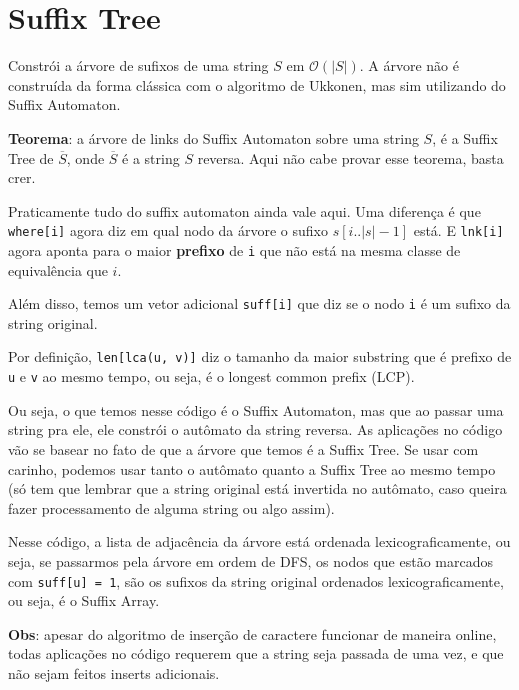 \documentclass[10pt, a4paper, oneside]{book}
\begin{document}
\section{Suffix Tree}


Constrói a árvore de sufixos de uma string $S$ em $\mathcal{O}(|S|)$. A árvore não é construída da forma clássica com o algoritmo de Ukkonen, mas sim utilizando do Suffix Automaton.



\textbf{Teorema}: a árvore de links do Suffix Automaton sobre uma string $S$, é a Suffix Tree de $\overline{S}$, onde $\overline{S}$ é a string $S$ reversa. Aqui não cabe provar esse teorema, basta crer.



Praticamente tudo do suffix automaton ainda vale aqui. Uma diferença é que \texttt{where[i]} agora diz em qual nodo da árvore o sufixo $s[i..|s|-1]$ está. E \texttt{lnk[i]} agora aponta para o maior \textbf{prefixo} de \texttt{i} que não está na mesma classe de equivalência que $i$.



Além disso, temos um vetor adicional \texttt{suff[i]} que diz se o nodo \texttt{i} é um sufixo da string original.



Por definição, \texttt{len[lca(u, v)]} diz o tamanho da maior substring que é prefixo de \texttt{u} e \texttt{v} ao mesmo tempo, ou seja, é o longest common prefix (LCP).



Ou seja, o que temos nesse código é o Suffix Automaton, mas que ao passar uma string pra ele, ele constrói o autômato da string reversa. As aplicações no código vão se basear no fato de que a árvore que temos é a Suffix Tree. Se usar com carinho, podemos usar tanto o autômato quanto a Suffix Tree ao mesmo tempo (só tem que lembrar que a string original está invertida no autômato, caso queira fazer processamento de alguma string ou algo assim).



Nesse código, a lista de adjacência da árvore está ordenada lexicograficamente, ou seja, se passarmos pela árvore em ordem de DFS, os nodos que estão marcados com \texttt{suff[u] = 1}, são os sufixos da string original ordenados lexicograficamente, ou seja, é o Suffix Array.



\textbf{Obs}: apesar do algoritmo de inserção de caractere funcionar de maneira online, todas aplicações no código requerem que a string seja passada de uma vez, e que não sejam feitos inserts adicionais.
\hfill
\end{document}
